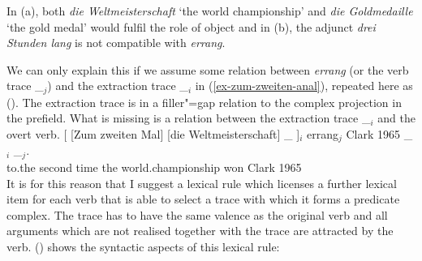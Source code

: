 In (a), both \emph{die Weltmeisterschaft} `the world championship' and \emph{die
  Goldmedaille} `the gold medal' would fulfil the role of object and in (b),
the adjunct \emph{drei Stunden lang} is not compatible with \emph{errang}.

We can only explain this if we assume some relation between \emph{errang} (or the verb trace \_$_j$) and the extraction trace
\_$_i$ in (\ref{ex-zum-zweiten-anal}), repeated here as (). The extraction trace is in a filler"=gap relation to the
complex projection in the prefield. What is missing is a relation between the extraction trace \_$_i$ and the overt verb.
\ea
\label{ex-zum-zweiten-anal-zwei}%
\gll {}[ [Zum zweiten Mal] [die Weltmeisterschaft] \_ ]$_i$ errang$_j$ Clark 1965 \_$_i$ \_$_j$.\\
      {}         \spacebr{}to.the second time \spacebr{}the world.championship {} {} won Clark 1965\\
\z 
It is for this reason that I suggest a lexical rule which licenses a further lexical item for each verb that is able to select a trace
with which it forms a predicate complex. The trace has to have the same valence as the original verb and all arguments which are
not realised together with the trace are attracted by the verb. () shows the syntactic aspects of this lexical rule:

